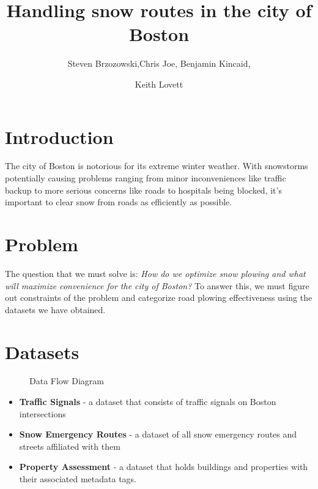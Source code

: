 \documentclass[15pt]{report}
\begin{document}
	
\title{Handling snow routes in the city of Boston} 

\author{Steven Brzozowski,Chris Joe, Benjamin Kincaid, \and Keith Lovett}
\maketitle

\section*{Introduction}
The city of Boston is notorious for its extreme winter weather. With snowstorms potentially causing problems ranging from minor inconveniences like traffic backup to more serious concerns like roads to hospitals being blocked, it's important to clear snow from roads as efficiently as possible. 

\section*{Problem}
The question that we must solve is: \textit{How do we optimize snow plowing and what will maximize convenience for the city of Boston?} To answer this, we must figure out constraints of the problem and categorize road plowing effectiveness using the datasets we have obtained.

\section*{Datasets}
\begin{figure}[h!]
	\centering
	\caption{Data Flow Diagram}
	\label{fig:method}
\end{figure}
\begin{itemize}
	\item \textbf{Traffic Signals} - a dataset that consists of traffic signals on Boston intersections
	\item \textbf{Snow Emergency Routes} - a dataset of all snow emergency routes and streets affiliated with them
	\item \textbf{Property Assessment} - a dataset that holds buildings and properties with their associated metadata tags.
\end{itemize}
\end{document}
